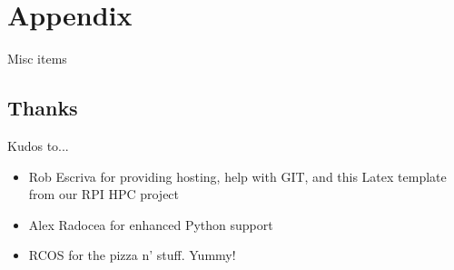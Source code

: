\section{Appendix}
Misc items

\subsection{Thanks}
\label{sec::appendix::thanks}

Kudos to...
\begin{itemize}
\item Rob Escriva for providing hosting, help with GIT, and this Latex template from our RPI HPC project
\item Alex Radocea for enhanced Python support
\item RCOS for the pizza n' stuff.  Yummy!

\end{itemize}

